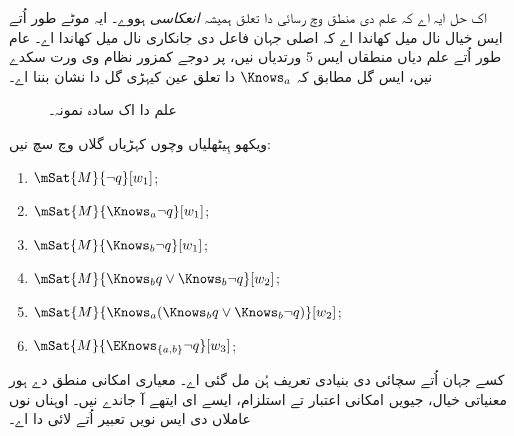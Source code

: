\documentclass[../../../include/open-logic-section]{subfiles}
\begin{document}
اک حل ایہ اے کہ علم دی منطق وچ رسائی دا تعلق ہمیشہ
\emph{انعکاسی} ہووے۔ ایہ موٹے طور اُتے ایس خیال نال میل کھاندا اے
کہ اصلی جہان فاعل دی جانکاری نال میل کھاندا اے۔ عام طور اُتے علم
دیاں منطقاں ایس 5 ورتدیاں نیں، پر دوجے کمزور نظام وی ورت سکدے نیں،
ایس گل مطابق کہ $\Knows_a$ دا تعلق عین کیہڑی گل دا نشان بننا اے۔

\begin{figure}
  \begin{center}
  \end{center}
  \caption{علم دا اک سادہ نمونہ۔}
\end{figure}

\begin{prob}
  ویکھو ہِیٹھلیاں وچوں کہڑیاں گلاں
   وچ سچ نیں:
  \begin{enumerate}
    \item $\mSat{M}{\lnot q}[w_1]$;
    \item $\mSat{M}{\Knows_a \lnot q}[w_1]$;
    \item $\mSat{M}{\Knows_b \lnot q}[w_1]$;
    \item $\mSat{M}{\Knows_b q \lor \Knows_b \lnot q}[w_2]$;
    \item $\mSat{M}{\Knows_a( \Knows_b q \lor \Knows_b \lnot q)}[w_2]$;
    \item $\mSat{M}{\EKnows_{\{a,b\}} \lnot q}[w_3]$;
    \end{enumerate}
\end{prob}

کسے جہان اُتے سچائی دی بنیادی تعریف ہُن مل گئی اے۔ معیاری
امکانی منطق دے ہور معنیاتی خیال، جیویں امکانی اعتبار تے استلزام،
ایسے ای ایتھے آ جاندے نیں۔ اوہناں نوں عاملاں دی ایس نویں تعبیر
اُتے لائی دا اے۔
\end{document}
